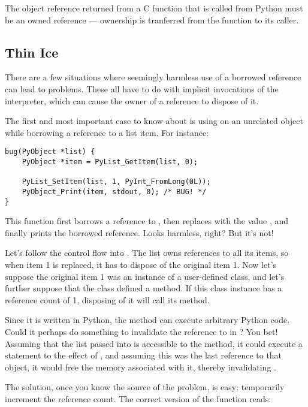 \documentclass{manual}
\begin{document}
The object reference returned from a C function that is called from
Python must be an owned reference --- ownership is tranferred from the
function to its caller.


\subsection{Thin Ice
            \label{thinIce}}

There are a few situations where seemingly harmless use of a borrowed
reference can lead to problems.  These all have to do with implicit
invocations of the interpreter, which can cause the owner of a
reference to dispose of it.

The first and most important case to know about is using
 on an unrelated object while borrowing a
reference to a list item.  For instance:

\begin{verbatim}
bug(PyObject *list) {
    PyObject *item = PyList_GetItem(list, 0);

    PyList_SetItem(list, 1, PyInt_FromLong(0L));
    PyObject_Print(item, stdout, 0); /* BUG! */
}
\end{verbatim}

This function first borrows a reference to , then
replaces  with the value , and finally prints
the borrowed reference.  Looks harmless, right?  But it's not!

Let's follow the control flow into .  The list
owns references to all its items, so when item 1 is replaced, it has
to dispose of the original item 1.  Now let's suppose the original
item 1 was an instance of a user-defined class, and let's further
suppose that the class defined a  method.  If this
class instance has a reference count of 1, disposing of it will call
its  method.

Since it is written in Python, the  method can execute
arbitrary Python code.  Could it perhaps do something to invalidate
the reference to  in ?  You bet!  Assuming
that the list passed into  is accessible to the
 method, it could execute a statement to the effect of
, and assuming this was the last reference to that
object, it would free the memory associated with it, thereby
invalidating .

The solution, once you know the source of the problem, is easy:
temporarily increment the reference count.  The correct version of the
function reads:
\end{document}
